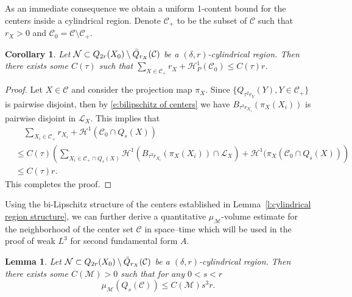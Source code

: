 \documentclass[11pt,reqno]{amsart}
\numberwithin{equation}{section}
\newcommand{\cC}{\mathcal{C}}
\newcommand{\cH}{\mathcal{H}}
\newcommand{\cL}{\mathcal{L}}
\newcommand{\cM}{\mathcal{M}}
\newcommand{\cN}{\mathcal{N}}
\newtheorem{lemma}[equation]{Lemma}
\newtheorem{corollary}[equation]{Corollary}
\theoremstyle{definition}
\theoremstyle{remark}
\theoremstyle{remark}
\theoremstyle{remark}
\theoremstyle{remark}\newtheorem{conjecture}[equation]{Conjecture}
\theoremstyle{remark}\newtheorem{question}[equation]{Question}
\begin{document}
As an immediate consequence we obtain a uniform 1-content bound for the centers inside a cylindrical
region. Denote $\cC_{+}$ to be the subset of $\cC$ such that $r_X>0$ and $\cC_0=\cC\setminus \cC_{+}$. 

\begin{corollary}\label{c:measure upper bound}
Let $\cN \subset Q_{2r}(X_0) \setminus \Bar{Q}_{r_X}(\cC)$ be a $(\delta,r)$-cylindrical region. Then there exists some $C(\tau)$ such that 
    $\sum_{X\in \cC_+} r_X + \cH^1_P(\cC_0)  \le C(\tau) r$. 
\end{corollary}

\begin{proof}
    Let $X \in \cC$ and consider the projection map $\pi_X$. Since $\{Q_{\tau^2 r_Y}(Y),Y\in \cC_+\}$ is pairwise disjoint, then by \eqref{e:bilipschitz of centers} we have $B_{\tau^3 r_{X_i}}(\pi_X(X_i))$ is pairwise disjoint in $\cL_{X}$. This implies that 
\begin{equation*}
\begin{split}
     &\quad \sum_{X_i \in \cC_+} r_{X_i} + \cH^1(\cC_0 \cap Q_s(X))\\ 
     &\le C(\tau) \left(\sum_{X_i \in \cC_+ \cap Q_{s}(X)} \cH^1(B_{\tau^3 r_{X_i}}(\pi_X(X_i)) \cap \cL_{X}) + \cH^1(\pi_X(\cC_0 \cap Q_s(X)) \right)\\
    &\le C(\tau) r.
\end{split}
\end{equation*}
This completes the proof.
\end{proof}

Using the bi-Lipschitz structure of the centers established in Lemma~\ref{l:cylindrical region structure}, we can further derive a quantitative $\mu_{\cM}$-volume estimate for the neighborhood of the center set $\cC$ in space–time which will be used in the proof of weak $L^3$ for second fundamental form $A$.

\begin{lemma}\label{l:volume of center}
    Let $\cN \subset Q_{2r}(X_0) \setminus \Bar{Q}_{r_X}(\cC)$ be a $(\delta,r)$-cylindrical region. Then there exists some $C(\cM)>0$ such that for any $0<s<r$
    \begin{equation*}
        \mu_{\cM}(Q_{s}(\cC)) \le C(\cM) s^3r.
    \end{equation*}
\end{lemma}
\end{document}
